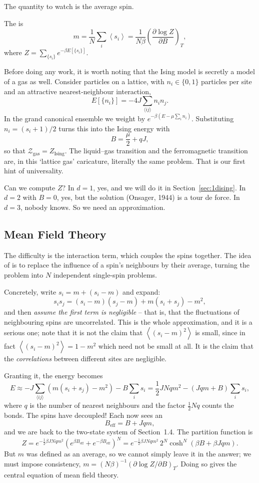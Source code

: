\documentclass[a4paper]{scrartcl}
\newcommand{\avg}[1]{\left\langle #1 \right\rangle}
\begin{document}
The quantity to watch is the average spin.

\begin{definition}[Magnetisation]
	The  is
	$$
	m = \frac 1N \sum_i \avg{s_i} = \frac{1}{N\beta}\left(\frac{\partial \log Z}{\partial B}\right)_T,
	$$
	where $Z = \sum_{\{s_i\}}e^{-\beta E[\{s_i\}]}$.
\end{definition}

Before doing any work, it is worth noting that the Ising model is secretly a model of a gas as well. Consider particles on a lattice, with $n_i \in \{0,1\}$ particles per site and an attractive nearest-neighbour interaction,
$$
E[\{n_i\}] = -4J\sum_{\langle ij\rangle}n_i n_j.
$$
In the grand canonical ensemble we weight by $e^{-\beta(E - \mu\sum_i n_i)}$. Substituting $n_i = (s_i+1)/2$ turns this into the Ising energy with
$$
B = \frac\mu2 + qJ,
$$
so that $\mathcal Z_{\mathrm{gas}} = Z_{\mathrm{Ising}}$. The liquid--gas transition and the ferromagnetic transition are, in this `lattice gas' caricature, literally the same problem. That is our first hint of universality.

Can we compute $Z$? In $d=1$, yes, and we will do it in Section~\ref{sec:1dising}. In $d = 2$ with $B = 0$, yes, but the solution (Onsager, 1944) is a tour de force. In $d = 3$, nobody knows. So we need an approximation.

\subsection{Mean Field Theory}\label{sec:meanfield}

The difficulty is the interaction term, which couples the spins together. The idea of  is to replace the influence of a spin's neighbours by their average, turning the problem into $N$ independent single-spin problems.

Concretely, write $s_i = m + (s_i - m)$ and expand:
$$
s_i s_j = (s_i - m)(s_j - m) + m(s_i + s_j) - m^2,
$$
and then \emph{assume the first term is negligible} -- that is, that the fluctuations of neighbouring spins are uncorrelated. This is the whole approximation, and it is a serious one; note that it is not the claim that $\avg{(s_i-m)^2}$ is small, since in fact $\avg{(s_i-m)^2} = 1 - m^2$ which need not be small at all. It is the claim that the \emph{correlations} between different sites are negligible.

Granting it, the energy becomes
$$
E \approx -J\sum_{\langle ij\rangle}\left(m(s_i+s_j) - m^2\right) - B\sum_i s_i = \frac 12 JNqm^2 - (Jqm + B)\sum_i s_i,
$$
where $q$ is the number of nearest neighbours and the factor $\tfrac12 Nq$ counts the bonds. The spins have decoupled! Each now sees an 
$$
B_{\mathrm{eff}} = B + Jqm,
$$
and we are back to the two-state system of Section~1.4. The partition function is
$$
Z = e^{-\frac 12\beta JNqm^2}\left(e^{\beta B_{\mathrm{eff}}}+e^{-\beta B_{\mathrm{eff}}}\right)^N = e^{-\frac 12 \beta JNqm^2}\,2^N\cosh^N(\beta B + \beta Jqm).
$$
But $m$ was defined as an average, so we cannot simply leave it in the answer; we must impose consistency, $m = (N\beta)^{-1}(\partial\log Z/\partial B)_T$. Doing so gives the central equation of mean field theory.
\end{document}
